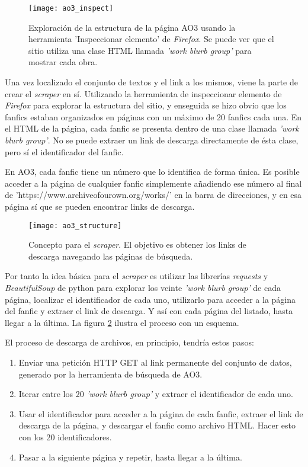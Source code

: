 \documentclass{pre-tfg}
\begin{document}
\begin{figure}
	\texttt{[image: ao3\_inspect]}
	\caption{Exploración de la estructura de la página AO3 usando la herramienta 'Inspeccionar elemento' de \textit{Firefox}. Se puede ver que el sitio utiliza una clase HTML llamada \textit{'work blurb group'} para mostrar cada obra.}
	\label{fig:ao3_inspect}
	\centering
\end{figure} 

Una vez localizado el conjunto de textos y el link a los mismos, viene la parte de crear el \textit{scraper} en sí. Utilizando la herramienta de inspeccionar elemento de \textit{Firefox} para explorar la estructura del sitio, y enseguida se hizo obvio que los fanfics estaban organizados en páginas con un máximo de 20 fanfics cada una. En el HTML de la página, cada fanfic se presenta dentro de una clase llamada \textit{'work blurb group'}. No se puede extraer un link de descarga directamente de ésta clase, pero sí el identificador del fanfic.

En AO3, cada fanfic tiene un número que lo identifica de forma única. Es posible acceder a la página de cualquier fanfic simplemente añadiendo ese número al final de \newline 'https://www.archiveofourown.org/works/' en la barra de direcciones, y en esa página sí que se pueden encontrar links de descarga.

\begin{figure}[h]
	\texttt{[image: ao3\_structure]}
	\caption{Concepto para el \textit{scraper}. El objetivo es obtener los links de descarga navegando las páginas de búsqueda.}
	\label{fig:ao3_structure}
	\centering
\end{figure}

Por tanto la idea básica para el \textit{scraper} es utilizar las librerías \textit{requests} y \textit{BeautifulSoup} de python para explorar los veinte \textit{'work blurb group'} de cada página, localizar el identificador de cada uno, utilizarlo para acceder a la página del fanfic y extraer el link de descarga. Y así con cada página del listado, hasta llegar a la última. La figura \ref{fig:ao3_structure} ilustra el proceso con un esquema.

El proceso de descarga de archivos, en principio, tendría estos pasos:

\begin{enumerate}
	\item Enviar una petición HTTP GET al link permanente del conjunto de datos, generado por la herramienta de búsqueda de AO3.
	\item Iterar entre los 20 \textit{'work blurb group'} y extraer el identificador de cada uno.
	\item Usar el identificador para acceder a la página de cada fanfic, extraer el link de descarga de la página, y descargar el fanfic como archivo HTML. Hacer esto con los 20 identificadores.
	\item Pasar a la siguiente página y repetir, hasta llegar a la última.
\end{enumerate}
\end{document}
